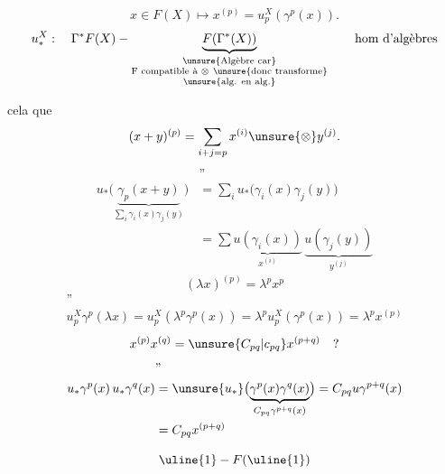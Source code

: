 
\[
x\in F(X)\longmapsto x^{(p)}=u_p^X(\gamma^p(x)).
\]
\[
u_*^X:\quad \Gamma^*F(X)-
\underbrace{F(\Gamma^*(X))}_{\substack{\unsure{\text{Algèbre car}}\\
\text{F compatible à }\otimes\ \unsure{\text{donc transforme}}\\
\unsure{\text{alg. en alg.}}}}
\qquad \text{hom d'algèbres}
\]

cela   que
\[
(x+y)^{(p)}=\sum_{i+j=p}x^{(i)}\unsure{\otimes}y^{(j)}.
\]
\[
\begin{aligned}
&\text{''}\\
u_*\bigl(\underbrace{\gamma_p(x+y)}_{\sum_i\gamma_i(x)\gamma_j(y)}\bigr)
&=\sum_i u_*\bigl(\gamma_i(x)\gamma_j(y)\bigr)\\
&=\sum\underbrace{u(\gamma_i(x))}_{x^{(i)}}\,
\underbrace{u(\gamma_j(y))}_{y^{(j)}}
\end{aligned}
\]
\[
(\lambda x)^{(p)}=\lambda^p x^p
\]
\[
\begin{gathered}
\text{''}\\
u_p^X\gamma^p(\lambda x)=u_p^X(\lambda^p\gamma^p(x))
=\lambda^p u_p^X(\gamma^p(x))=\lambda^p x^{(p)}
\end{gathered}
\]
\[
x^{(p)}x^{(q)}=\unsure{C_{pq}|c_{pq}}x^{(p+q)}\quad ?
\]
\[
\begin{aligned}
&\text{''}\\
u_*\gamma^p(x)\,u_*\gamma^q(x)
&=\unsure{u_*}\bigl(\underbrace{\gamma^p(x)\gamma^q(x)}_{C_{pq}\gamma^{p+q}(x)}\bigr)
=C_{pq}u\gamma^{p+q}(x)\\
&=C_{pq}x^{(p+q)}
\end{aligned}
\]

\[
\uline{1}-F(\uline{1})
\]
  

